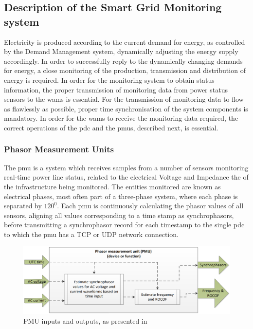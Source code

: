 \subsection{Description of the Smart Grid  Monitoring system}
Electricity is produced according to the current demand for energy, as controlled by the Demand Management system, dynamically adjusting the energy supply accordingly. In order to successfully reply to the dynamically changing demands for energy, a close monitoring of the production, transmission and distribution of energy is required. In order for the monitoring system to obtain status information, the proper transmission of monitoring data from power status sensors to the \acrshort{wams} is essential. For the transmission of monitoring data to flow as flawlessly as possible, proper time synchronisation of the system components is mandatory.
In order for the \acrshort{wams} to receive the monitoring data required, the correct operations of the \acrshort{pdc} and the \acrshort{pmu}s, described next, is essential.



\subsubsection{Phasor Measurement Units}
The \acrfull{pmu} is a system which receives samples from a number of sensors monitoring  real-time power line status, related to the electrical Voltage and Impedance the of the infrastructure being monitored. 
The entities monitored are known as electrical phases, most often part of a three-phase system, where each phase is separated by $120^0$.
Each \acrshort{pmu} is continuously calculating the phasor values of all sensors, aligning all values corresponding to a time stamp as synchrophasors, before transmitting a synchrophasor record for each timestamp to the single \acrfull{pdc} to which the \acrshort{pmu} has a  TCP or UDP network connection. 





\begin{figure}%
\includegraphics[width=\linewidth]{figures/PMU-in-out.eps}
\caption[PMU inputs and outputs]{PMU inputs and outputs, as presented in \Cite[p.12]{iec2018measuring}
}
\label{fig:PMU-in-out}
\end{figure}

